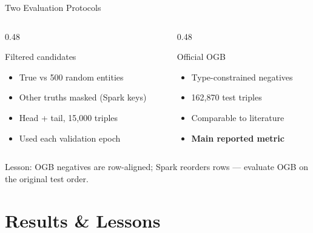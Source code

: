 \documentclass[aspectratio=43,11pt]{beamer}
\begin{document}
\begin{frame}{Two Evaluation Protocols}
  \begin{columns}[T]
    \begin{column}{0.48\textwidth}
      \begin{block}{Filtered candidates}
        \begin{itemize}
          \item True vs 500 random entities
          \item Other truths masked (Spark keys)
          \item Head + tail, 15{,}000 triples
          \item Used each validation epoch
        \end{itemize}
      \end{block}
    \end{column}
    \begin{column}{0.48\textwidth}
      \begin{block}{Official OGB}
        \begin{itemize}
          \item Type-constrained negatives
          \item 162{,}870 test triples
          \item Comparable to literature
          \item \textbf{Main reported metric}
        \end{itemize}
      \end{block}
    \end{column}
  \end{columns}
  \vspace{0.5em}
  \alert{Lesson:} OGB negatives are row-aligned; Spark reorders rows ---
  evaluate OGB on the original test order.
\end{frame}

\section{Results \& Lessons}
\end{document}
